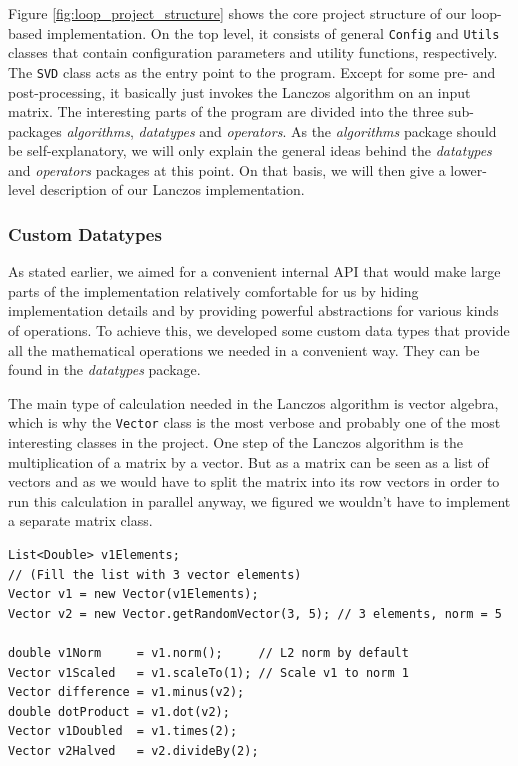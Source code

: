 Figure \ref{fig:loop_project_structure} shows the core project structure of our
loop-based implementation. On the top level, it consists of general
\texttt{Config} and \texttt{Utils} classes that contain configuration
parameters and utility functions, respectively. The \texttt{SVD} class acts as
the entry point to the program. Except for some pre- and post-processing, it
basically just invokes the Lanczos algorithm on an input matrix. The
interesting parts of the program are divided into the three sub-packages
\textit{algorithms}, \textit{datatypes} and \textit{operators}. As the
\textit{algorithms} package should be self-explanatory, we will only explain
the general ideas behind the \textit{datatypes} and  \textit{operators}
packages at this point. On that basis, we will then give a lower-level
description of our Lanczos implementation.


\subsubsection{Custom Datatypes}
\label{ssec:custom_datatypes}

As stated earlier, we aimed for a convenient internal API that would make large
parts of the implementation relatively comfortable for us by hiding
implementation details and by providing powerful abstractions for various kinds
of operations. To achieve this, we developed some custom data types that
provide all the mathematical operations we needed in a convenient way. They can
be found in the \textit{datatypes} package.


The main type of calculation needed in the Lanczos algorithm is vector algebra,
which is why the \texttt{Vector} class is the most verbose and probably one of
the most interesting classes in the project. One step of the Lanczos algorithm
is the multiplication of a matrix by a vector. But as a matrix can be seen as a
list of vectors and as we would have to split the matrix into its row vectors
in order to run this calculation in parallel anyway, we figured we wouldn't
have to implement a separate matrix class.

\begin{lstlisting}[label=lst:vector_usage,captionpos=b,caption=Example use of
the \texttt{Vector} class]
List<Double> v1Elements;
// (Fill the list with 3 vector elements)
Vector v1 = new Vector(v1Elements);
Vector v2 = new Vector.getRandomVector(3, 5); // 3 elements, norm = 5

double v1Norm     = v1.norm();     // L2 norm by default
Vector v1Scaled   = v1.scaleTo(1); // Scale v1 to norm 1
Vector difference = v1.minus(v2);
double dotProduct = v1.dot(v2);
Vector v1Doubled  = v1.times(2);
Vector v2Halved   = v2.divideBy(2);
\end{lstlisting}

